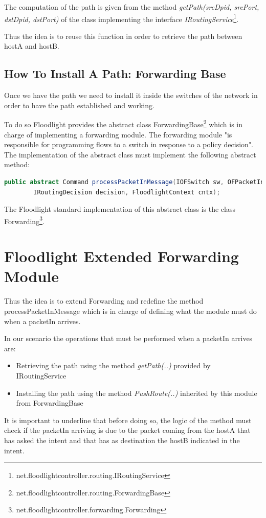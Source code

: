 \documentclass[a4paper]{report}
\begin{document}
	\noindent The computation of the path is given from the method \textit{getPath(srcDpid, srcPort, dstDpid, dstPort)} of the class implementing the interface \textit{IRoutingService}\footnote{net.floodlightcontroller.routing.IRoutingService}.
	
	\noindent Thus the idea is to reuse this function in order to retrieve the path between hostA and hostB.
	
	\subsection{How To Install A Path: Forwarding Base}
	\noindent Once we have the path we need to install it inside the switches of the network in order to have the path established and working.
	
	\noindent To do so Floodlight provides the abstract class ForwardingBase\footnote{net.floodlightcontroller.routing.ForwardingBase} which is in charge of implementing a forwarding module. The forwarding module "is responsible for programming flows to a switch in response to a policy decision". The implementation of the abstract class must implement the following abstract method:
	
	\begin{lstlisting}[language=Java]
		public abstract Command processPacketInMessage(IOFSwitch sw, OFPacketIn pi, 
		IRoutingDecision decision, FloodlightContext cntx);
	\end{lstlisting}
	
	
	\noindent The Floodlight standard implementation of this abstract class is the class Forwarding\footnote{net.floodlightcontroller.forwarding.Forwarding}.
	
	\section{Floodlight Extended Forwarding Module}\label{forwarding}
	\noindent Thus the idea is to extend Forwarding and redefine the method processPacketInMessage which is in charge of defining what the module must do when a packetIn arrives.
	
	\noindent In our scenario the operations that must be performed when a packetIn arrives are:
	\begin{itemize}
		\item Retrieving the path using the method \textit{getPath(..)} provided by IRoutingService
		\item Installing the path using the method \textit{PushRoute(..)} inherited by this module from ForwardingBase
	\end{itemize}
	\noindent It is important to underline that before doing so, the logic of the method must check if the packetIn arriving is due to the packet coming from the hostA that has asked the intent and that has as destination the hostB indicated in the intent.
	
\end{document}

